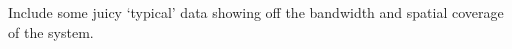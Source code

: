 \thispagestyle{empty}
Include some juicy `typical' data showing off the bandwidth and spatial coverage of the system.
